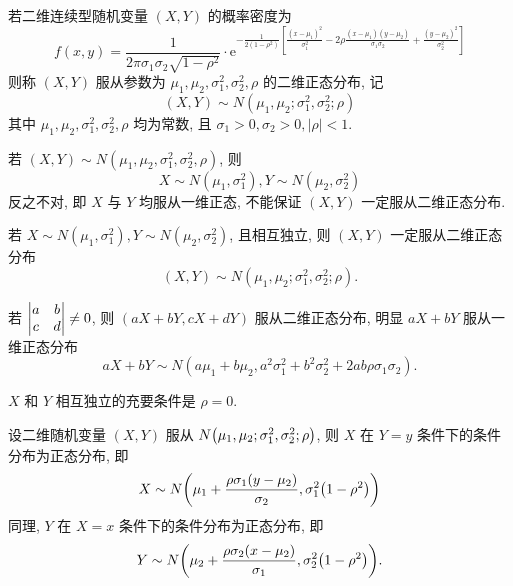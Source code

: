 \begin{definition}[二维正态分布]
    若二维连续型随机变量 $ (X, Y) $ 的概率密度为
    $$f(x,y)=\frac{1}{2 \pi \sigma_{1} \sigma_{2} \sqrt{1-\rho^{2}}} \cdot \mathrm{e}^{-\frac{1}{2\left(1-\rho^{2}\right)}\left[\frac{\left(x-\mu_{1}\right)^{2}}{\sigma_{1}^{2}}-2 \rho \frac{\left(x-\mu_{1}\right)\left(y-\mu_{2}\right)}{\sigma_{1} \sigma_{2}}+\frac{\left(y-\mu_{2}\right)^{2}}{\sigma_{2}^{2}}\right]}$$
    则称 $ (X, Y) $ 服从参数为 $ \mu_{1}, \mu_{2}, \sigma_{1}^{2}, \sigma_{2}^{2}, \rho $ 的二维正态分布, 
    记 $$ (X, Y) \sim N\left(\mu_{1}, \mu_{2}; \sigma_{1}^{2}, \sigma_{2}^{2}; \rho\right) $$
    其中 $ \mu_{1}, \mu_{2}, \sigma_{1}^{2}, \sigma_{2}^{2}, \rho $ 均为常数, 且 $ \sigma_{1}>0, \sigma_{2}>0,|\rho|<1 .$
\end{definition}
\begin{theorem}[二维正态分布推出一维正态分布]
    若 $ (X, Y) \sim N\left(\mu_{1}, \mu_{2}, \sigma_{1}^{2}, \sigma_{2}^{2}, \rho\right) $, 则
    $$X \sim N\left(\mu_{1}, \sigma_{1}^{2}\right), Y \sim N\left(\mu_{2}, \sigma_{2}^{2}\right)$$
    反之不对, 即 $ X $ 与 $ Y $ 均服从一维正态, 不能保证 $ (X, Y) $ 一定服从二维正态分布.
\end{theorem}

\begin{theorem}[独立一维正态分布推出二维正态分布]
    若 $ X \sim N\left(\mu_{1}, \sigma_{1}^{2}\right), Y \sim N\left(\mu_{2}, \sigma_{2}^{2}\right)$, 且相互独立, 则 $ (X, Y) $ 一定服从二维正态分布
    $$ (X, Y) \sim N\left(\mu_{1}, \mu_{2}; \sigma_{1}^{2}, \sigma_{2}^{2}; \rho\right) .$$
\end{theorem}

\begin{theorem}
    若 $\mqty|a&b\\c&d|\neq0$, 则 $ (a X+b Y, c X+d Y) $ 服从二维正态分布, 明显 $ a X+b Y $ 服从一维正态分布
    $$a X+b Y \sim N\left(a \mu_{1}+b \mu_{2}, a^{2} \sigma_{1}^{2}+b^{2} \sigma_{2}^{2}+2 a b \rho \sigma_{1} \sigma_{2}\right) .$$
\end{theorem}

\begin{theorem}
    $X $ 和 $ Y $ 相互独立的充要条件是 $ \rho=0 .$
\end{theorem}

\begin{theorem}[二维正态分布的条件分布]
    设二维随机变量 $(X,Y)$ 服从 $N\qty(\mu_1,\mu_2;\sigma^2_1,\sigma^2_2;\rho)$, 则 $X$ 在 $Y=y$ 条件下的条件分布为正态分布, 即
    $$X\sim N\qty(\mu_1+\dfrac{\rho\sigma_1(y-\mu_2)}{\sigma_2},\sigma_1^2\qty(1-\rho^2))$$
    同理, $Y$ 在 $X=x$ 条件下的条件分布为正态分布, 即
    $$Y\sim N\qty(\mu_2+\dfrac{\rho\sigma_2(x-\mu_2)}{\sigma_1},\sigma_2^2\qty(1-\rho^2)).$$
\end{theorem}

